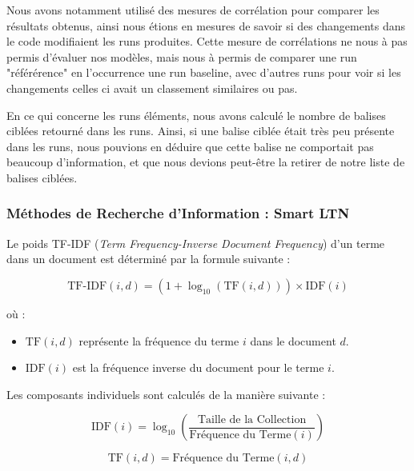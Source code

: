 \documentclass[a4paper, 12pt]{article}
\begin{document}
Nous avons notamment utilisé des mesures de corrélation pour comparer les résultats obtenus, ainsi nous étions en mesures 
de savoir si des changements dans le code modifiaient les runs produites. Cette mesure de corrélations ne nous à pas permis d'évaluer
nos modèles, mais nous à permis de comparer une run "référérence" en l'occurrence une run baseline, avec d'autres runs pour voir si les changements
celles ci avait un classement similaires ou pas.

En ce qui concerne les runs éléments, nous avons calculé le nombre de balises ciblées retourné dans les runs. Ainsi, si une balise ciblée était
très peu présente dans les runs, nous pouvions en déduire que cette balise ne comportait pas beaucoup d'information, et que nous devions peut-être
la retirer de notre liste de balises ciblées.

\subsubsection{Méthodes de Recherche d'Information : Smart LTN}

Le poids TF-IDF (\textit{Term Frequency-Inverse Document Frequency}) d'un terme dans un document est déterminé par la formule suivante :

\begin{equation}
\text{TF-IDF}(i, d) = \left(1 + \log_{10}(\text{TF}(i, d))\right) \times \text{IDF}(i)
\end{equation}

où :
\begin{itemize}
    \item $\text{TF}(i, d)$ représente la fréquence du terme $i$ dans le document $d$.
    \item $\text{IDF}(i)$ est la fréquence inverse du document pour le terme $i$.
\end{itemize}

Les composants individuels sont calculés de la manière suivante :

\begin{equation}
\text{IDF}(i) = \log_{10}\left(\frac{\text{Taille de la Collection}}{\text{Fréquence du Terme}(i)}\right)
\end{equation}

\begin{equation}
\text{TF}(i, d) = \text{Fréquence du Terme}(i, d)
\end{equation}
\end{document}
